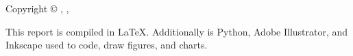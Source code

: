 \thispagestyle{empty}
{\small
\strut\vfill %
\noindent Copyright \copyright{} \projectGroup{}, \projectFaculty{}, \AAU{} \the\year\par%
\vspace{0.2cm}
\noindent This report is compiled in \LaTeX. Additionally is Python, Adobe Illustrator, and  Inkscape used to code, draw figures, and charts.
}
\clearpage
